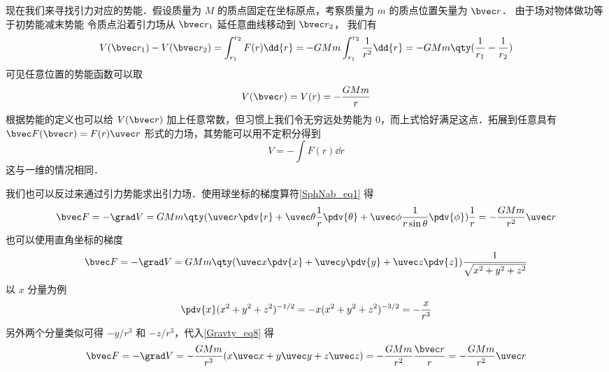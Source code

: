 现在我们来寻找引力对应的势能．假设质量为 $M$ 的质点固定在坐标原点，考察质量为 $m$ 的质点位置矢量为 $\bvec r$． 由于场对物体做功等于初势能减末势能
令质点沿着引力场从 ${\bvec r_1}$ 延任意曲线移动到 $\bvec r_2$， 我们有
\begin{equation}
V(\bvec r_1) - V(\bvec r_2) = \int_{r_1}^{r_2} F(r) \dd{r} =  - GMm\int_{r_1}^{r_2} \frac{1}{r^2} \dd{r}  =  - GMm \qty( \frac{1}{r_1} - \frac{1}{r_2} )
\end{equation}
可见任意位置的势能函数可以取
\begin{equation}
V(\bvec r) = V(r) = - \frac{GMm}{r}
\end{equation}
根据势能的定义也可以给 $V(\bvec r)$ 加上任意常数，但习惯上我们令无穷远处势能为 0，而上式恰好满足这点．拓展到任意具有 $\bvec F(\bvec r) = F(r)\uvec r$ 形式的力场，其势能可以用不定积分得到
\begin{equation}\label{Gravty_eq7}
V = -\int F(r) \dd{r}
\end{equation}
这与一维的情况相同．%

我们也可以反过来通过引力势能求出引力场．使用球坐标的梯度算符\autoref{SphNab_eq1} 得
\begin{equation}
\bvec F = -\grad V = GMm \qty( \uvec r\pdv{r} + \uvec \theta \frac{1}{r}\pdv{\theta} + \uvec \phi \frac{1}{r\sin \theta}\pdv{\phi} )\frac{1}{r} =  - \frac{GMm}{r^2}\uvec r
\end{equation}
也可以使用直角坐标的梯度
\begin{equation}\label{Gravty_eq8}
\bvec F = -\grad V = GMm \qty(\uvec x\pdv{x} + \uvec y\pdv{y} + \uvec z\pdv{z} )\frac{1}{\sqrt{x^2 + y^2 + z^2}}
\end{equation}
以 $x$ 分量为例
\begin{equation}
\pdv{x}(x^2 + y^2 + z^2)^{-1/2} =  - x(x^2 + y^2 + z^2)^{-3/2} =  - \frac{x}{r^3}
\end{equation}
另外两个分量类似可得 $- y/r^3$ 和 $- z/r^3$，代入\autoref{Gravty_eq8} 得
\begin{equation}
\bvec F = -\grad V =  - \frac{GMm}{r^3} (x\uvec x + y\uvec y + z\uvec z) =  - \frac{GMm}{r^2}\frac{\bvec r}{r} =  - \frac{GMm}{r^2}\uvec r
\end{equation}
